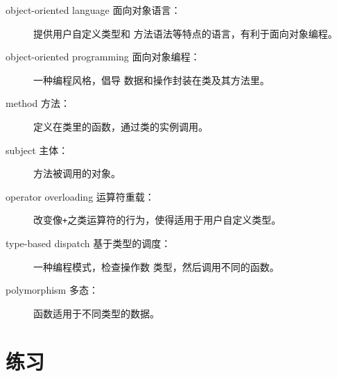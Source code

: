 \begin{description}

\item [object-oriented language 面向对象语言：] 提供用户自定义类型和
方法语法等特点的语言，有利于面向对象编程。

\item [object-oriented programming 面向对象编程：]一种编程风格，倡导
数据和操作封装在类及其方法里。

\item [method 方法：] 定义在类里的函数，通过类的实例调用。

\item [subject 主体：]方法被调用的对象。

\item [operator overloading 运算符重载：]改变像{\tt +}之类运算符的行为，使得适用于用户自定义类型。

\item [type-based dispatch 基于类型的调度：]一种编程模式，检查操作数
类型，然后调用不同的函数。

\item[polymorphism 多态：] 函数适用于不同类型的数据。


\end{description}

\section{练习}

